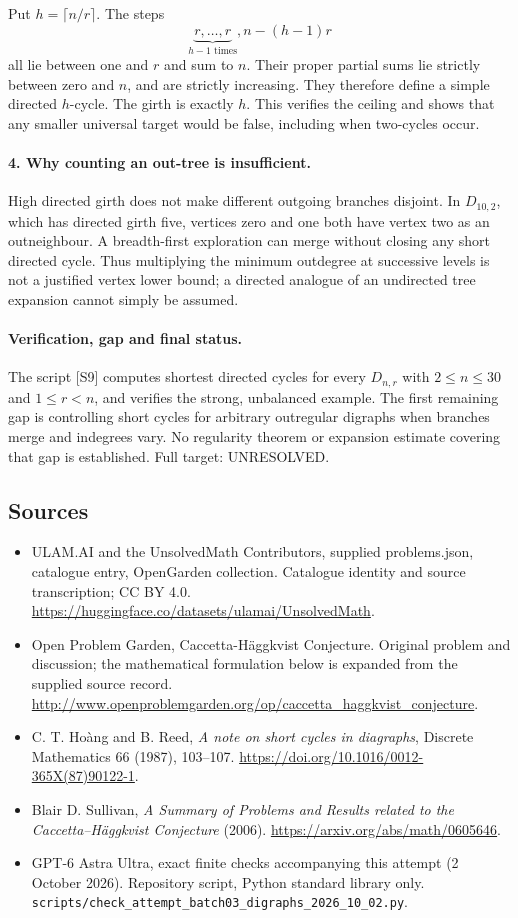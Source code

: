 \documentclass[11pt,a4paper]{article}
\begin{document}
Put $h=\lceil n/r\rceil$. The steps
\[
 \underbrace{r,\ldots,r}_{h-1\text{ times}},
                    n-(h-1)r
\]
all lie between one and $r$ and sum to $n$. Their proper partial
sums lie strictly between zero and $n$, and are strictly increasing.
They therefore define a simple directed $h$-cycle. The girth is
exactly $h$. This verifies the ceiling and shows that any smaller
universal target would be false, including when two-cycles occur.

\paragraph{4. Why counting an out-tree is insufficient.}
High directed girth does not make different outgoing branches
disjoint. In $D_{10,2}$, which has directed girth five, vertices zero
and one both have vertex two as an outneighbour. A breadth-first
exploration can merge without closing any short directed cycle.
Thus multiplying the minimum outdegree at successive levels is
not a justified vertex lower bound; a directed analogue of an
undirected tree expansion cannot simply be assumed.

\paragraph{Verification, gap and final status.}
The script [S9] computes shortest directed cycles for every
$D_{n,r}$ with $2\le n\le30$ and $1\le r<n$, and verifies the
strong, unbalanced example. The first remaining gap is controlling
short cycles for arbitrary outregular digraphs when branches merge
and indegrees vary. No regularity theorem or expansion estimate
covering that gap is established. Full target: UNRESOLVED.
\subsection{Sources}
\begin{itemize}
\item[S1] ULAM.AI and the UnsolvedMath Contributors, supplied problems.json, catalogue entry, OpenGarden collection. Catalogue identity and source transcription; CC BY 4.0.
\url{https://huggingface.co/datasets/ulamai/UnsolvedMath}.
\item[S2] Open Problem Garden, Caccetta-Häggkvist Conjecture. Original problem and discussion; the mathematical formulation below is expanded from the supplied source record.
\url{http://www.openproblemgarden.org/op/caccetta_haggkvist_conjecture}.
\item[S3] C. T. Ho\`ang and B. Reed, \emph{A note on short cycles in diagraphs}, Discrete Mathematics 66 (1987), 103--107. \url{https://doi.org/10.1016/0012-365X(87)90122-1}.
\item[S4] Blair D. Sullivan, \emph{A Summary of Problems and Results related to the Caccetta--H\"aggkvist Conjecture} (2006). \url{https://arxiv.org/abs/math/0605646}.
\item[S9] GPT-6 Astra Ultra, exact finite checks accompanying this attempt (2 October 2026). Repository script, Python standard library only. \texttt{scripts/check\_attempt\_batch03\_digraphs\_2026\_10\_02.py}.
\end{itemize}
\end{document}
